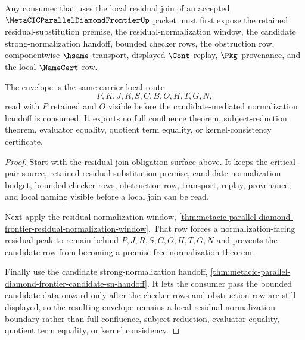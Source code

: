 \begin{theorem}
\label{thm:metacic-parallel-diamond-frontier-residual-normalization-envelope}
Any consumer that uses the local residual join of an accepted $\MetaCICParallelDiamondFrontierUp$ packet must first expose the retained residual-substitution premise, the residual-normalization window, the candidate strong-normalization handoff, bounded checker rows, the obstruction row, componentwise $\hsame$ transport, displayed $\Cont$ replay, $\Pkg$ provenance, and the local $\NameCert$ row.

The envelope is the same carrier-local route
$$
P,K,J,R,S,C,B,O,H,T,G,N ,
$$
read with $P$ retained and $O$ visible before the candidate-mediated normalization handoff is consumed. It exports no full confluence theorem, subject-reduction theorem, evaluator equality, quotient term equality, or kernel-consistency certificate.
\end{theorem}
\begin{proof}
Start with the residual-join obligation surface above. It keeps the critical-pair source, retained residual-substitution premise, candidate-normalization budget, bounded checker rows, obstruction row, transport, replay, provenance, and local naming visible before a local join can be read.

Next apply the residual-normalization window, \autoref{thm:metacic-parallel-diamond-frontier-residual-normalization-window}. That row forces a normalization-facing residual peak to remain behind $P,J,R,S,C,O,H,T,G,N$ and prevents the candidate row from becoming a premise-free normalization theorem.

Finally use the candidate strong-normalization handoff, \autoref{thm:metacic-parallel-diamond-frontier-candidate-sn-handoff}. It lets the consumer pass the bounded candidate data onward only after the checker rows and obstruction row are still displayed, so the resulting envelope remains a local residual-normalization boundary rather than full confluence, subject reduction, evaluator equality, quotient term equality, or kernel consistency.
\end{proof}

